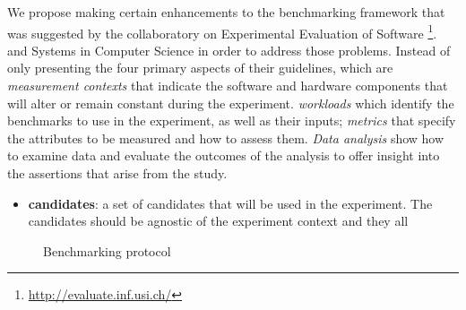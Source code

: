 
We propose making certain enhancements to the benchmarking framework that was suggested by the collaboratory on Experimental Evaluation of Software \footnote{\url{http://evaluate.inf.usi.ch/}}. and Systems in Computer Science in order to address those problems.
Instead of only presenting the four primary aspects of their guidelines, which are \emph{measurement contexts} that indicate the software and hardware components that will alter or remain constant during the experiment. \emph{workloads} which identify the benchmarks to use in the experiment, as well as their inputs; \emph{metrics} that specify the attributes to be measured and how to assess them. \emph{Data analysis} show how to examine data and evaluate the outcomes of the analysis to offer insight into the assertions that arise from the study.

\begin{itemize}
    \item \textbf{candidates}: a set of candidates that will be used in the experiment. The candidates should be agnostic of the experiment context and they all
\end{itemize}





\begin{figure}%
    \caption{Benchmarking protocol}\label{fig:benchmarkingprotocol}
\end{figure}





